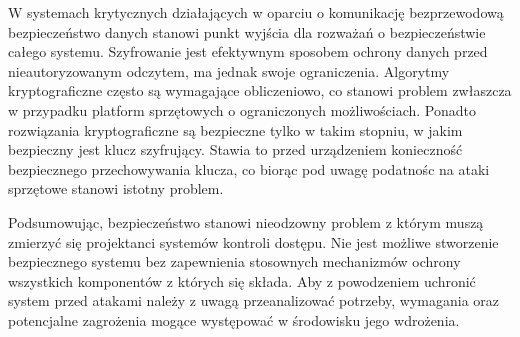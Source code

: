 \begin{enumerate}[label=\Alph*.]
				W systemach krytycznych działających w oparciu o komunikację bezprzewodową bezpieczeństwo danych stanowi punkt wyjścia dla rozważań o bezpieczeństwie całego systemu. Szyfrowanie jest efektywnym sposobem ochrony danych przed nieautoryzowanym odczytem, ma jednak swoje ograniczenia. Algorytmy kryptograficzne często są wymagające obliczeniowo, co stanowi problem zwłaszcza w przypadku platform sprzętowych o ograniczonych możliwościach. Ponadto rozwiązania kryptograficzne są bezpieczne tylko w takim stopniu, w jakim bezpieczny jest klucz szyfrujący. Stawia to przed urządzeniem konieczność bezpiecznego przechowywania klucza, co biorąc pod uwagę podatnośc na ataki sprzętowe stanowi istotny problem.

		\end{enumerate}

		Podsumowując, bezpieczeństwo stanowi nieodzowny problem z którym muszą zmierzyć się projektanci systemów kontroli dostępu. Nie jest możliwe stworzenie bezpiecznego systemu bez zapewnienia stosownych mechanizmów ochrony wszystkich komponentów z których się składa. Aby z powodzeniem uchronić system przed atakami należy z uwagą przeanalizować potrzeby, wymagania oraz potencjalne zagrożenia mogące występować w środowisku jego wdrożenia.